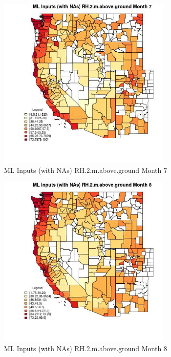 \begin{figure} 
\centering  
\includegraphics[width=0.77\textwidth]{Code_Outputs/Report_ML_input_PM25_Step4_part_e_de_duplicated_aves_compiled_2019-05-21wNAs_CountyRH2mabovegroundmedianMonth7.jpg} 
\caption{\label{fig:Report_ML_input_PM25_Step4_part_e_de_duplicated_aves_compiled_2019-05-21wNAsCountyRH2mabovegroundmedianMonth7}ML Inputs (with NAs) RH.2.m.above.ground Month 7} 
\end{figure} 
 

\begin{figure} 
\centering  
\includegraphics[width=0.77\textwidth]{Code_Outputs/Report_ML_input_PM25_Step4_part_e_de_duplicated_aves_compiled_2019-05-21wNAs_CountyRH2mabovegroundmedianMonth8.jpg} 
\caption{\label{fig:Report_ML_input_PM25_Step4_part_e_de_duplicated_aves_compiled_2019-05-21wNAsCountyRH2mabovegroundmedianMonth8}ML Inputs (with NAs) RH.2.m.above.ground Month 8} 
\end{figure} 
 

